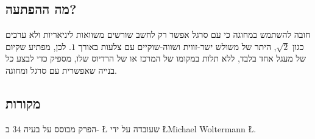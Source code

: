 \subsection*{מה ההפתעה?}

חובה להשתמש במחוגה כי עם סרגל אפשר רק לחשב שורשים  משוואות ליניאריות ולא ערכים כגון
$\sqrt{2}$,
היתר של משולש ישר-זווית ושווה-שוקיים עם צלעות באורך
$1$.
לכן, מפתיע שקיום של מעגל אחד בלבד, ללא תלות במקומו של המרכז או של הרדיוס שלו, מספיק כדי לבצע כל בנייה שאפשרית עם סרגל ומחוגה.


\subsection*{מקורות}
הפרק מבוסס על בעיה
$34$
ב-%
\L{\cite{dorrie1}}
שעובדה על ידי
\L{Michael Woltermann} \L{\cite{dorrie2}}. 
